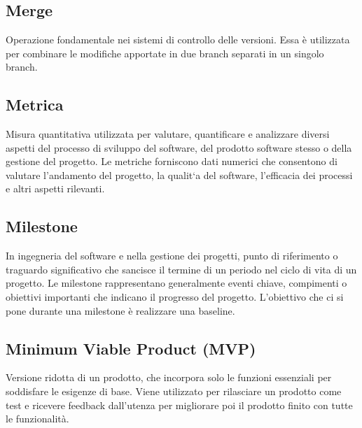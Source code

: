 
\section{}

\hypertarget{sec:merge}{}
\subsection*{Merge}
Operazione fondamentale nei sistemi di controllo delle versioni. Essa è utilizzata per combinare le modifiche apportate in due branch separati in un 
singolo branch.

\hypertarget{sec:metrica}{}
\subsection*{Metrica}
Misura quantitativa utilizzata per valutare, quantificare e analizzare diversi aspetti del processo di sviluppo del software, del prodotto software stesso o della gestione del
progetto. Le metriche forniscono dati numerici che consentono di valutare l’andamento del
progetto, la qualit`a del software, l’efficacia dei processi e altri aspetti rilevanti.

\subsection*{Milestone}
In ingegneria del software e nella gestione dei progetti, punto di riferimento o traguardo significativo che sancisce il termine di un periodo nel ciclo 
di vita di un progetto. Le milestone rappresentano generalmente eventi chiave, compimenti o obiettivi importanti che indicano il progresso del progetto. 
L’obiettivo che ci si pone durante una milestone è realizzare una baseline.

\hypertarget{sec:MVP}{}
\subsection*{Minimum Viable Product (MVP)}
Versione ridotta di un prodotto, che incorpora solo le funzioni essenziali per soddisfare le esigenze di base. Viene utilizzato per rilasciare un prodotto 
come test e ricevere feedback dall’utenza per migliorare poi il prodotto finito con tutte le funzionalità.

\newpage



